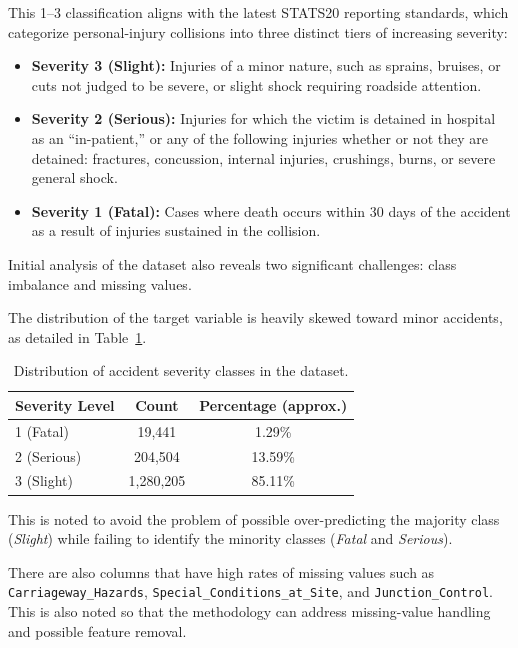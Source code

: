 This 1--3 classification aligns with the latest STATS20 reporting standards, which categorize personal-injury collisions into three distinct tiers of increasing severity:
\begin{itemize}
    \item \textbf{Severity 3 (Slight):} Injuries of a minor nature, such as sprains, bruises, or cuts not judged to be severe, or slight shock requiring roadside attention.
    \item \textbf{Severity 2 (Serious):} Injuries for which the victim is detained in hospital as an ``in-patient,'' or any of the following injuries whether or not they are detained: fractures, concussion, internal injuries, crushings, burns, or severe general shock.
    \item \textbf{Severity 1 (Fatal):} Cases where death occurs within 30 days of the accident as a result of injuries sustained in the collision.
\end{itemize}

Initial analysis of the dataset also reveals two significant challenges: class imbalance and missing values.

The distribution of the target variable is heavily skewed toward minor accidents, as detailed in Table~\ref{tab:severity_distribution}.

\begin{table}[h]
\centering
\caption{Distribution of accident severity classes in the dataset.}
\label{tab:severity_distribution}
\begin{tabular}{lcc}
\toprule
\textbf{Severity Level} & \textbf{Count} & \textbf{Percentage (approx.)} \\
\midrule
1 (Fatal)   & 19,441   & 1.29\%  \\
2 (Serious) & 204,504  & 13.59\% \\
3 (Slight)  & 1,280,205 & 85.11\% \\
\bottomrule
\end{tabular}
\end{table}

This is noted to avoid the problem of possible over-predicting the majority class (\textit{Slight}) while failing to identify the minority classes (\textit{Fatal} and \textit{Serious}).

There are also columns that have high rates of missing values such as \texttt{Carriageway\_Hazards}, \texttt{Special\_Conditions\_at\_Site}, and \texttt{Junction\_Control}. This is also noted so that the methodology can address missing-value handling and possible feature removal.